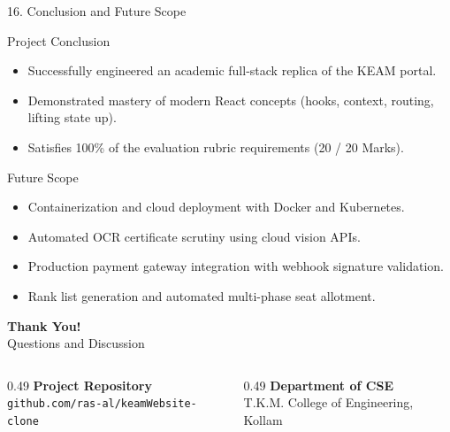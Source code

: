 \documentclass[aspectratio=169, 10pt]{beamer}
\begin{document}
\begin{frame}{16. Conclusion and Future Scope}
  \small
  \begin{block}{Project Conclusion}
    \begin{itemize}
      \item Successfully engineered an academic full-stack replica of the KEAM portal.
      \item Demonstrated mastery of modern React concepts (hooks, context, routing, lifting state up).
      \item Satisfies 100\% of the evaluation rubric requirements (20 / 20 Marks).
    \end{itemize}
  \end{block}
  \begin{block}{Future Scope}
    \begin{itemize}
      \item Containerization and cloud deployment with Docker and Kubernetes.
      \item Automated OCR certificate scrutiny using cloud vision APIs.
      \item Production payment gateway integration with webhook signature validation.
      \item Rank list generation and automated multi-phase seat allotment.
    \end{itemize}
  \end{block}
\end{frame}

\begin{frame}[plain]
  \vfill
  \centering
  {\Huge\textbf{\color{NavyBlue} Thank You!}}\\[0.6cm]
  {\Large Questions and Discussion}\\[1.2cm]
  \begin{columns}[T,onlytextwidth]
    \begin{column}{0.49\textwidth}
      \centering
      \textbf{Project Repository}\\[2pt]
      \texttt{github.com/ras-al/keamWebsite-clone}
    \end{column}
    \begin{column}{0.49\textwidth}
      \centering
      \textbf{Department of CSE}\\[2pt]
      T.K.M. College of Engineering, Kollam
    \end{column}
  \end{columns}
  \vfill
\end{frame}
\end{document}
